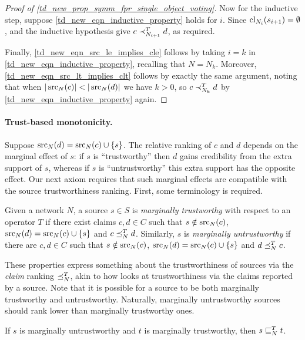 \begin{proof}[Proof of \cref{td_new_prop_symm_fpr_single_object_voting}]
    Now for the inductive step, suppose \cref{td_new_eqn_inductive_property}
    holds for $i$. Since $\operatorname{cl}_{N_i}(s_{i + 1}) = \emptyset$,
    \freshposresp{} and the inductive hypothesis give $c \prec_{N_{i + 1}}^T d$,
    as required.

    Finally, \cref{td_new_eqn_src_le_implies_cle} follows by taking $i = k$ in
    \cref{td_new_eqn_inductive_property}, recalling that $N = N_k$. Moreover,
    \cref{td_new_eqn_src_lt_implies_clt} follows by exactly the same argument,
    noting that when $|\operatorname{src}_N(c)| < |\operatorname{src}_N(d)|$ we have $k > 0$, so $c
    \prec_{N_k}^T d$ by \cref{td_new_eqn_inductive_property} again.
\end{proof}

\paragraph{Trust-based monotonicity.}

Suppose $\operatorname{src}_N(d) = \operatorname{src}_N(c) \cup \{s\}$. The relative ranking of $c$ and
$d$ depends on the marginal effect of $s$: if $s$ is ``trustworthy'' then $d$
gains credibility from the extra support of $s$, whereas if $s$ is
``untrustworthy'' this extra support has the opposite effect. Our next axiom
requires that such marginal effects are compatible with the source
trustworthiness ranking. First, some terminology is required.

\begin{definition}
    Given a network $N$, a source $s \in S$ is \emph{marginally trustworthy}
    with respect to an operator $T$ if there exist claims $c, d \in C$ such
    that $s \notin \operatorname{src}_N(c)$, $\operatorname{src}_N(d) = \operatorname{src}_N(c) \cup \{s\}$ and $c
    \preceq_N^T d$.
    Similarly, $s$ is \emph{marginally untrustworthy} if there are $c, d  \in
    C$ such that $s \notin \operatorname{src}_N(c)$, $\operatorname{src}_N(d) = \operatorname{src}_N(c) \cup \{s\}$ and
    $d \preceq_N^T c$.
\end{definition}

These properties express something about the trustworthiness of sources
via the \emph{claim} ranking $\preceq_N^T$, akin to how \sourcecoherence{} looks
at trustworthiness via the claims reported by a source. Note that it is
possible for a source to be both marginally trustworthy and untrustworthy.
Naturally, marginally untrustworthy sources should rank lower than marginally
trustworthy ones.

\begin{axiom}[\marginaltrustworthiness{}]
    If $s$ is marginally untrustworthy and $t$ is marginally trustworthy, then
    $s \sqsubseteq_N^T t$.
\end{axiom}

